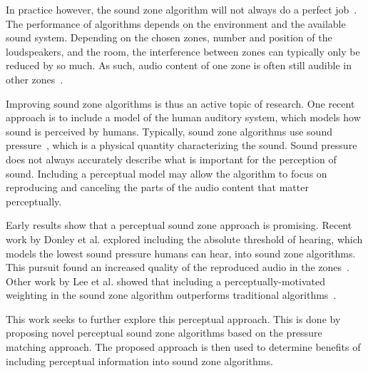 In practice however, the sound zone algorithm will not always do a perfect job~\cite{moller2016sound}.
The performance of algorithms depends on the environment and the available sound system.
Depending on the chosen zones, number and position of the loudspeakers, and the room, the interference between zones can typically only be reduced by so much.
As such, audio content of one zone is often still audible in other zones~\cite{moller2016sound}.

Improving sound zone algorithms is thus an active topic of research.
One recent approach is to include a model of the human auditory system, which models how sound is perceived by humans.
Typically, sound zone algorithms use sound pressure~\cite{betlehem2015personal}, which is a physical quantity characterizing the sound.
Sound pressure does not always accurately describe what is important for the perception of sound.
Including a perceptual model may allow the algorithm to focus on reproducing and canceling the parts of the audio content
that matter perceptually.

Early results show that a perceptual sound zone approach is promising.
Recent work by Donley et al. explored including the absolute threshold of hearing, which models the lowest sound pressure
humans can hear, into sound zone algorithms.
This pursuit found an increased quality of the reproduced audio in the zones~\cite{donley2015multizone}.
Other work by Lee et al. showed that including a perceptually-motivated weighting in the sound zone algorithm outperforms 
traditional algorithms~\cite{lee2019towards,lee2020signal}.

This work seeks to further explore this perceptual approach.
This is done by proposing novel perceptual sound zone algorithms based on the pressure matching approach.
The proposed approach is then used to determine benefits of including perceptual information into
sound zone algorithms.
